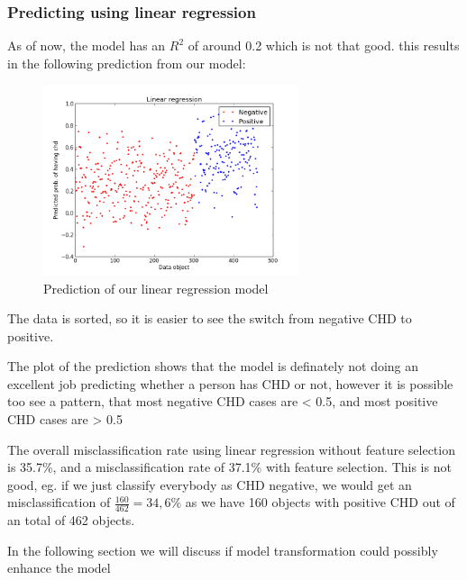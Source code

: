 \subsubsection{Predicting using linear regression}
As of now, the model has an $R^{2}$ of around 0.2 which is not that good. this results in the following prediction from our model:
\begin{figure}[H]
\centering
\includegraphics[width=7.5cm, keepaspectratio=true]{pictures/linearPrediction.png}
\caption{Prediction of our linear regression model}
\label{linearPrediction}
\end{figure}
The data is sorted, so it is easier to see the switch from negative CHD to positive.

The plot of the prediction shows that the model is definately not doing an excellent job predicting whether a person has CHD or not, however it is possible too see a pattern, that most negative CHD cases are < 0.5, and most positive CHD cases are > 0.5

The overall misclassification rate using linear regression without feature selection is 35.7\%, and a misclassification rate of 37.1\% with feature selection. This is not good, eg. if we just classify everybody as CHD negative, we would get an misclassification of $\frac{160}{462} = 34,6\%$ as we have 160 objects with positive CHD out of an total of 462 objects.

In the following section we will discuss if model transformation could possibly enhance the model
